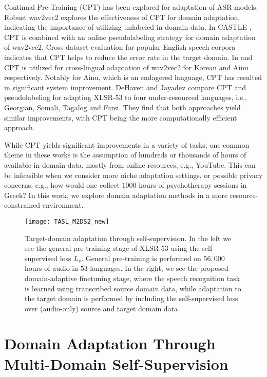 \documentclass[journal]{IEEEtran}
\begin{document}
Continual Pre-Training (CPT) has been explored for adaptation of ASR models.
Robust wav2vec2 \cite{hsu21_interspeech} explores the effectiveness of CPT for domain adaptation, indicating the importance of utilizing unlabeled in-domain data.
In CASTLE \cite{zhu2022boosting}, CPT is combined with an online pseudolabeling strategy for domain adaptation of wav2vec2. Cross-dataset evaluation for popular English speech corpora indicates that CPT helps to reduce the error rate in the target domain.
In \cite{kim22e_interspeech} and \cite{NOWAKOWSKI2023103149}
CPT is utilized for cross-lingual adaptation of wav2vec2 for Korean and Ainu respectively. Notably for Ainu, which is an endagered language, CPT has resulted in significant system improvement. DeHaven and Jayadev \cite{dehaven2022improving} compare CPT and pseudolabeling for adapting XLSR-53 to four  under-resourced languages, i.e., Georgian, Somali, Tagalog and Farsi. They find that both approaches yield similar improvements, with CPT being the more computationally efficient approach.

While CPT yields significant improvements in a variety of tasks, one common theme in these works is the assumption of hundreds or thousands of hours of available in-domain data, mostly from online resources, e.g., YouTube. This can be infeasible when we consider more niche adaptation settings, or possible privacy concerns, e.g., how would one collect $1000$ hours of psychotherapy sessions in Greek? In this work, we explore domain adaptation methods in a more resource-constrained environment.



\begin{figure}[t!]
    \centering
    \texttt{[image: TASL\_M2DS2\_new]}
    \vspace{5mm}
    \caption{Target-domain adaptation through self-supervision. In the left we see the general pre-training stage of XLSR-53 using the self-supervised loss $L_s$. General pre-training is performed on $56,000$ hours of audio in $53$ languages. In the right, we see the proposed domain-adaptive finetuning stage, where the speech recognition task is learned using transcribed source domain data, while adaptation to the target domain is performed by including the self-supervised loss over (audio-only) source and target domain data}
    \label{fig:m2ds2}
\end{figure}






\section{Domain Adaptation Through Multi-Domain Self-Supervision}
\label{sec:method}
\end{document}
